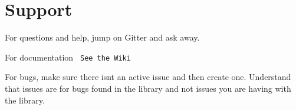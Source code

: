 \chapter{Support}
\label{md_lib_2_rtc-master_2_s_u_p_p_o_r_t}
\label{md_lib_2_rtc-master_2_s_u_p_p_o_r_t_autotoc_md9}%


For questions and help, jump on Gitter and ask away. ~\newline
 {\texttt{ }}

For documentation {\texttt{ See the Wiki}}

For bugs, make sure there isn\textquotesingle{}t an active issue and then create one. Understand that issues are for bugs found in the library and not issues you are having with the library. ~\newline
 